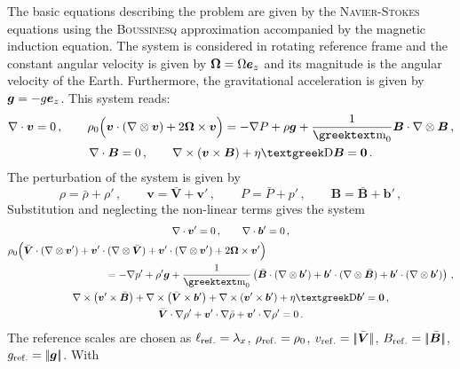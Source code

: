 The basic equations describing the problem are given by the \textsc{Navier}-\textsc{Stokes} equations using the \textsc{Boussinesq} approximation accompanied by the magnetic induction equation. The system is considered in rotating reference frame and the constant angular velocity is given by $\bm{\Omega}=\Omega\bm{e}_z$ and its magnitude is the angular velocity of the Earth. Furthermore, the gravitational acceleration is given by $\bm{g}=-g\bm{e}_z$. This system reads:
\begin{gather}
	\nabla\cdot\bm{v}=0\,, \qquad
	\rho_0\Big(\bm{v}\cdot(\nabla\otimes\bm{v})+2\bm{\Omega}\times\bm{v}\Big)=-\nabla P+\rho\bm{g}+\frac{1}{\gmu_0}\bm{B}\cdot\nabla\otimes\bm{B}\,,\\
	\nabla\cdot\bm{B}=0\,, \qquad
	\nabla\times\left(\bm{v}\times\bm{B}\right)+\eta\laplace\bm{B}=\bm{0}\,.
\end{gather}
The perturbation of the system is given by
\begin{equation}
	\rho=\bar{\rho}+\rho'\,,\qquad
	\bm{v}=\bar{\bm{V}}+\bm{v}'\,,\qquad 
	P=\bar{P}+p'\,,\qquad
	\bm{B}=\bar{\bm{B}}+\bm{b}'\,,
\end{equation}
Substitution and neglecting the non-linear terms gives the system
\begin{subequations}
\begin{gather}
	\nabla\cdot\bm{v}'=0\,,\qquad \nabla\cdot\bm{b}'=0\,,\\
	\begin{multlined}
	\rho_0\Big(\bar{\bm{V}}\cdot(\nabla\otimes\bm{v}')+\bm{v}'\cdot(\nabla\otimes\bar{\bm{V}})+\bm{v}'\cdot(\nabla\otimes\bm{v}')+2\bm{\Omega}\times\bm{v}'\Big)\\
	\hspace{3cm}=-\nabla p'+\rho'\bm{g}+\frac{1}{\gmu_0}\left(\bar{\bm{B}}\cdot(\nabla\otimes\bm{b}')+\bm{b}'\cdot(\nabla\otimes\bar{\bm{B}})+\bm{b}'\cdot(\nabla\otimes\bm{b}')\right)\,,
	\end{multlined}\\
	\nabla\times\big(\bm{v}'\times\bar{\bm{B}}\big)+\nabla\times\left(\bar{\bm{V}}\times\bm{b}'\right)+\nabla\times\left(\bm{v}'\times\bm{b}'\right)+\eta\laplace\bm{b}'=\bm{0}\,,\\
	\bar{\bm{V}}\cdot\nabla\rho'+\bm{v}'\cdot\nabla\bar{\rho}+\bm{v}'\cdot\nabla\rho'=0\,.
\end{gather}
\end{subequations}
The reference scales are chosen as $\ell_{\mathrm{ref.}}=\lambda_x$, $\rho_{\mathrm{ref.}}=\rho_0$, $v_{\mathrm{ref.}}=|\!| \bar{\bm{V}} |\!|$, $B_{\mathrm{ref.}}=|\!| \bar{\bm{B}} |\!|$, $g_{\mathrm{ref.}}=|\!| \bm{g} |\!|$. With
